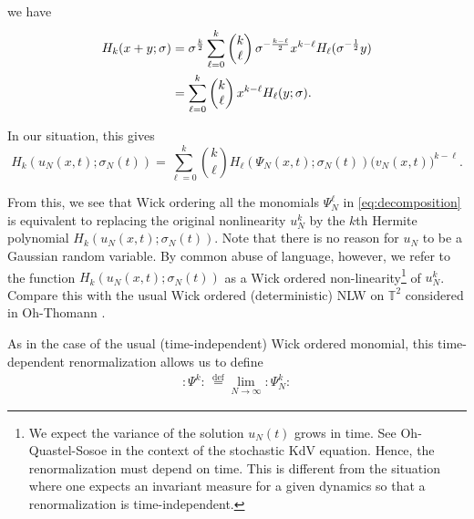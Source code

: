 \documentclass[letterpaper, 11pt,  reqno]{amsart}
\newcommand{\1}{\hspace{0.5mm}\text{I}\hspace{0.5mm}}
\newcommand{\noi}{\noindent}
\newcommand{\T}{\mathbb{T}}
\newcommand{\s}{\sigma}
\renewcommand{\l}{\ell}
\numberwithin{equation}{section}
\numberwithin{theorem}{section}
\begin{document}
\noi
we have 
\begin{align}
H_k(x+y; \s )
&  = \s^\frac{k}{2}\sum_{\l = 0}^k
\begin{pmatrix}
k \\ \l
\end{pmatrix}
\s^{-\frac{k-\l}{2}} x^{k - \l} H_\l(\s^{-\frac{1}{2}} y) \notag \\
&  = 
\sum_{\l = 0}^k
\begin{pmatrix}
k \\ \l
\end{pmatrix}
 x^{k - \l} H_\l(y; \s).
\label{Herm3}
\end{align}

\noi
In our situation, this gives 
\begin{equation*}
H_k(u_N(x, t);\s_N(t)) = \sum_{\l=0}^k {k\choose \ell} H_\ell(\Psi_N(x, t);\sigma_N(t)) 
\big(v_N(x, t)\big)^{k-\ell}.
\end{equation*}


\noi
From this, we see that 
 Wick ordering all the monomials $\Psi_N^\ell$ in 
\eqref{eq:decomposition}
 is equivalent to replacing the original nonlinearity $u_N^k$ by the $k$th Hermite polynomial 
 $H_k(u_N(x, t);\sigma_N(t))$. 
Note that there is no reason for $u_N$ to be a Gaussian random variable.
By common abuse of language, however, we refer to the function $H_k(u_N(x, t);\sigma_N(t))$ 
as a Wick ordered non-linearity\footnote{We expect the variance of the solution $u_N(t)$
grows in time.  See Oh-Quastel-Sosoe \cite{OQS2} in the context of the stochastic KdV equation.
Hence, the renormalization must depend on time.
This is different from the situation where one expects an invariant measure
for a given dynamics so that a renormalization is time-independent.}
of $u_N^k$.
Compare this with the usual Wick ordered (deterministic) NLW
on $\T^2$ considered in Oh-Thomann \cite{OT2}.



As in the case of  the usual (time-independent) Wick ordered monomial, 
this time-dependent renormalization allows us
to define 
\begin{align}
:\! \Psi^k  \!: \,      \stackrel{\text{def}}= \lim_{N\to \infty}    :\! \Psi_N^k \!: 
\label{Wick2}
\end{align}
\end{document}
